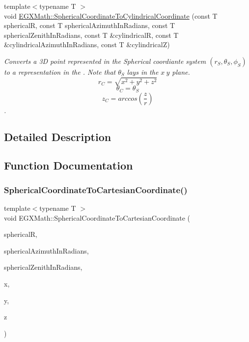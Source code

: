 \begin{DoxyCompactItemize}
{\footnotesize template$<$typename T $>$ }\\void \mbox{\hyperlink{group___e_g_x_math-_conversions-_coordinate_conversions-3_d-_spherical_ga655e1e596f225dc1692fa1ef744f785d}{E\+G\+X\+Math\+::\+Spherical\+Coordinate\+To\+Cylindrical\+Coordinate}} (const T sphericalR, const T spherical\+Azimuth\+In\+Radians, const T spherical\+Zenith\+In\+Radians, const T \&cylindricalR, const T \&cylindrical\+Azimuth\+In\+Radians, const T \&cylindricalZ)
\begin{DoxyCompactList}\small\item\em Converts a 3D point represented in the Spherical coordiante system $(r_S,\theta_S,\phi_S)$ to a representation in the . Note that $\theta_S$ lays in the $x\ y$ plane. \[ r_C = \sqrt{x^2+y^2+z^2} \] \[ \theta_C = \theta_S \] \[ z_C = arccos(\frac{z}{r}) \]. \end{DoxyCompactList}\end{DoxyCompactItemize}


\subsection{Detailed Description}


\subsection{Function Documentation}
\mbox{\label{group___e_g_x_math-_conversions-_coordinate_conversions-3_d-_spherical_ga6a11867b77c662565471eabac9b4d114}} 
\subsubsection{\texorpdfstring{Spherical\+Coordinate\+To\+Cartesian\+Coordinate()}{SphericalCoordinateToCartesianCoordinate()}}
{\footnotesize\ttfamily template$<$typename T $>$ \\
void E\+G\+X\+Math\+::\+Spherical\+Coordinate\+To\+Cartesian\+Coordinate (\begin{DoxyParamCaption}\item[{const T}]{sphericalR,  }\item[{const T}]{spherical\+Azimuth\+In\+Radians,  }\item[{const T}]{spherical\+Zenith\+In\+Radians,  }\item[{const T \&}]{x,  }\item[{const T \&}]{y,  }\item[{const T \&}]{z }\end{DoxyParamCaption})}



